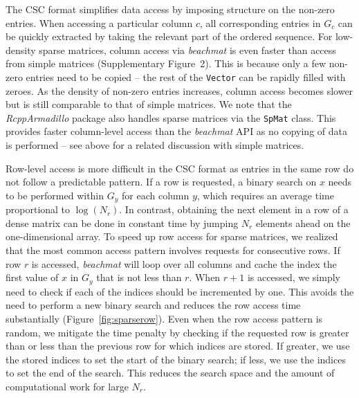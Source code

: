 \documentclass[10pt,letterpaper]{article}
\newcommand{\beachmat}{\textit{beachmat}}
\newcommand{\code}[1]{\texttt{#1}}
\newcommand{\suppfigsparsecol}{2}
\begin{document}

The CSC format simplifies data access by imposing structure on the non-zero entries.
When accessing a particular column $c$, all corresponding entries in $G_c$ can be quickly extracted by taking the relevant part of the ordered sequence.
For low-density sparse matrices, column access via \beachmat{} is even faster than access from simple matrices (Supplementary Figure~\suppfigsparsecol{}).
This is because only a few non-zero entries need to be copied -- the rest of the \code{Vector} can be rapidly filled with zeroes.
As the density of non-zero entries increases, column access becomes slower but is still comparable to that of simple matrices.
We note that the \textit{RcppArmadillo} package \cite{eddelbuettel2014arma} also handles sparse matrices via the \code{SpMat} class.
This provides faster column-level access than the \beachmat{} API as no copying of data is performed -- see above for a related discussion with simple matrices.

Row-level access is more difficult in the CSC format as entries in the same row do not follow a predictable pattern.
If a row is requested, a binary search on $x$ needs to be performed within $G_y$ for each column $y$, which requires an average time proportional to $\log(N_r)$.
In contrast, obtaining the next element in a row of a dense matrix can be done in constant time by jumping $N_r$ elements ahead on the one-dimensional array.
To speed up row access for sparse matrices, we realized that the most common access pattern involves requests for consecutive rows.
If row $r$ is accessed, \beachmat{} will loop over all columns and cache the index the first value of $x$ in $G_y$ that is not less than $r$.
When $r+1$ is accessed, we simply need to check if each of the indices should be incremented by one.
This avoids the need to perform a new binary search and reduces the row access time substantially (Figure~\ref{fig:sparserow}).
Even when the row access pattern is random, we mitigate the time penalty by checking if the requested row is greater than or less than the previous row for which indices are stored.
If greater, we use the stored indices to set the start of the binary search; if less, we use the indices to set the end of the search. 
This reduces the search space and the amount of computational work for large $N_r$.

\end{document}
